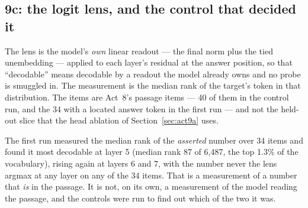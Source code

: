 \documentclass[11pt,a4paper]{article}
\begin{document}
\subsection{9c: the logit lens, and the control that decided it}
\label{sec:act9c}

The lens is the model's \emph{own} linear readout --- the final norm plus the
tied unembedding --- applied to each layer's residual at the answer position,
so that ``decodable'' means decodable by a readout the model already owns and
no probe is smuggled in. The measurement is the median rank of the target's
token in that distribution. The items are Act~8's passage items --- 40 of them
in the control run, and the 34 with a located answer token in the first run
--- and not the held-out slice that the head ablation of
Section~\ref{sec:act9a} uses.

The first run measured the median rank of the \emph{asserted} number over 34
items and found it most decodable at layer 5 (median rank 87 of 6,487, the
top 1.3\% of the vocabulary), rising again at layers 6 and 7, with the number
never the lens argmax at any layer on any of the 34 items. %
That is a measurement of a number that \emph{is} in the passage. It is not, on
its own, a measurement of the model reading the passage, and the controls were
run to find out which of the two it was.
\end{document}
